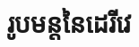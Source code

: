 \documentclass[12pt,fleqn]{book} %
\begin{document}
\newpage 
\section{រូបមន្តនៃដេរីវេ}
\end{document}
